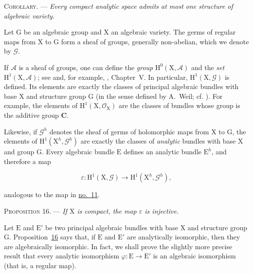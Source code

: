 \textsc{Corollary}. --- \emph{Every compact
analytic space admits at most one structure of algebraic variety.}


Let $\mathrm{G}$ be an algebraic group and $\mathrm{X}$ an algebraic variety. The germs of
regular maps from $\mathrm{X}$ to $\mathrm{G}$ form a sheaf of groups, generally non-abelian,
which we denote by $\mathcal{G}$.

If $\mathcal{A}$ is a sheaf of groups, one can define the \emph{group}
$\mathrm{H}^0(\mathrm{X},\mathcal{A})$ and the \emph{set}
$\mathrm{H}^1(\mathrm{X},\mathcal{A})$; see  and, for example, , Chapter~V. In
particular, $\mathrm{H}^1(\mathrm{X},\mathcal{G})$ is defined. Its elements are exactly
the classes of principal algebraic bundles with base $\mathrm{X}$ and structure
group $\mathrm{G}$ (in the sense defined by A.~Weil; cf. ). For example, the
elements of $\mathrm{H}^1(\mathrm{X},\mathcal{O}_\mathrm{X})$ are the classes of bundles
whose group is the additive group $\mathbf{C}$.

Likewise, if $\mathcal{G}^h$ denotes the sheaf of germs of holomorphic maps
from $\mathrm{X}$ to $\mathrm{G}$, the elements of
$\mathrm{H}^1(\mathrm{X}^h,\mathcal{G}^h)$ are exactly the classes of \emph{analytic}
bundles with base $\mathrm{X}$ and group $\mathrm{G}$. Every algebraic bundle $\mathrm{E}$
defines an analytic bundle $\mathrm{E}^h$, and therefore a map

\begin{equation*}
\varepsilon:\mathrm{H}^1(\mathrm{X},\mathcal{G})
\longrightarrow\mathrm{H}^1(\mathrm{X}^h,\mathcal{G}^h),
\end{equation*}

analogous to the map in \hyperref[gaga:no:11]{no.~11}.

\textsc{Proposition 16}. --- \emph{If $\mathrm{X}$ is
compact, the map $\varepsilon$ is injective.}

Let $\mathrm{E}$ and $\mathrm{E}'$ be two principal algebraic bundles with base $\mathrm{X}$ and
structure group $\mathrm{G}$. Proposition~\hyperref[gaga:prop:16]{16} says that, if
$\mathrm{E}$ and $\mathrm{E}'$ are analytically isomorphic, then they are algebraically
isomorphic. In fact, we shall prove the slightly more precise result that
every analytic isomorphism $\varphi:\mathrm{E}\to \mathrm{E}'$ is an algebraic isomorphism
(that is, a regular map).

